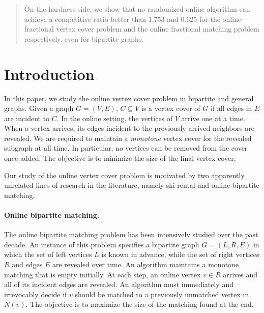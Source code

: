 \documentclass{article}
\begin{document}
\begin{abstract}
On the hardness side, we show that no randomized online algorithm can achieve a competitive ratio better than 1.753 and 0.625 for the online fractional vertex cover problem and the online fractional matching problem respectively, even for bipartite graphs.
\end{abstract}

\newtheorem{lemma}{Lemma}
\newtheorem{theorem}{Theorem}
\newtheorem{corollary}{Corollary}
\newtheorem{proposition}{Proposition}

\section{Introduction}

In this paper, we study the online vertex cover problem in bipartite and general graphs. Given a graph $G=(V,E)$, $C\subseteq V$ is a vertex cover of $G$ if all edges in $E$ are incident to $C$. In the online setting, the vertices of $V$ arrive one at a time. When a vertex arrives, its edges incident to the previously arrived neighbors are revealed. 
We are required to maintain a {\em monotone} vertex cover for the revealed subgraph at all time. In particular, no vertices can be removed from the cover once added. The objective is to minimize the size of the final vertex cover.

Our study of the online vertex cover problem is motivated by two apparently unrelated lines of research in the literature, namely ski rental and online bipartite matching. 

\paragraph{Online bipartite matching.}
The online bipartite matching problem has been intensively studied over the past decade. An instance of this problem specifies a bipartite graph $G=(L,R,E)$ in which the set of left vertices $L$ is known in advance, while the set of right vertices $R$ and edges $E$ are revealed over time. An algorithm maintains a monotone matching that is empty initially. At each step, an online vertex $v\in R$ arrives and all of its incident edges are revealed. An algorithm must immediately and irrevocably decide if $v$ should be matched to a previously unmatched vertex in $N(v)$. The objective is to maximize the size of the matching found at the end.
\end{document}
